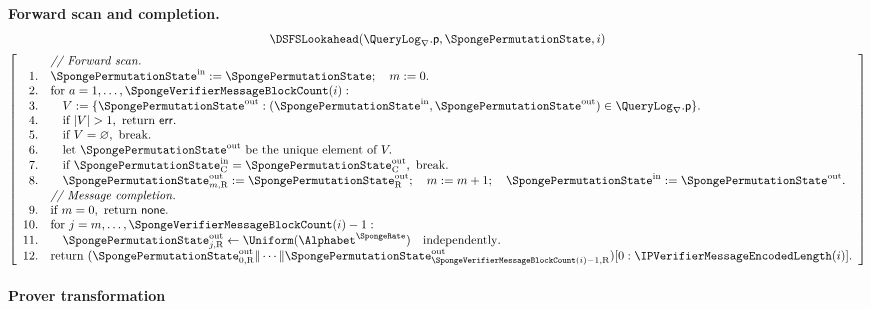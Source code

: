 \begin{definition}[LookAhead]
\medskip\noindent\textbf{Forward scan and completion.}
\begin{equation*}
\begin{gathered}
\DSFSLookahead(\QueryLog_{\nabla}.\mathsf p,\SpongePermutationState,i)\\[2pt]
\left[\begin{array}{rl}
& \textit{// Forward scan.}\\
1.& \SpongePermutationState^{\mathrm{in}}:=\SpongePermutationState;\quad m:=0.\\
2.& \text{for }a=1,\ldots,\SpongeVerifierMessageBlockCount(i):\\
3.& \quad V:=\{\SpongePermutationState^{\mathrm{out}}:(\SpongePermutationState^{\mathrm{in}},\SpongePermutationState^{\mathrm{out}})\in \QueryLog_{\nabla}.\mathsf p\}.\\
4.& \quad \text{if }|V|>1,\ \text{return }\mathsf{err}.\\
5.& \quad \text{if }V=\varnothing,\ \text{break}.\\
6.& \quad \text{let }\SpongePermutationState^{\mathrm{out}}\text{ be the unique element of }V.\\
7.& \quad \text{if }\SpongePermutationState^{\mathrm{in}}_{\mathrm C}=\SpongePermutationState^{\mathrm{out}}_{\mathrm C},\ \text{break}.\\
8.& \quad \SpongePermutationState^{\mathrm{out}}_{m,\mathrm R}:=\SpongePermutationState^{\mathrm{out}}_{\mathrm R};\quad m:=m+1;\quad \SpongePermutationState^{\mathrm{in}}:=\SpongePermutationState^{\mathrm{out}}.\\
& \textit{// Message completion.}\\
9.& \text{if }m=0,\ \text{return }\mathsf{none}.\\
10.& \text{for }j=m,\ldots,\SpongeVerifierMessageBlockCount(i)-1:\\
11.& \quad\SpongePermutationState^{\mathrm{out}}_{j,\mathrm R}\leftarrow\Uniform(\Alphabet^{\SpongeRate})\quad\text{independently}.\\
12.& \text{return }(\SpongePermutationState^{\mathrm{out}}_{0,\mathrm R}\|\cdots\|\SpongePermutationState^{\mathrm{out}}_{\SpongeVerifierMessageBlockCount(i)-1,\mathrm R})[0:\IPVerifierMessageEncodedLength(i)].
\end{array}\right]
\end{gathered}
\end{equation*}
\end{definition}

\paragraph{Prover transformation}

